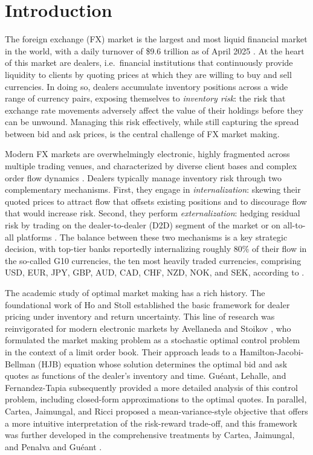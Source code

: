 \chapter{Introduction}
\label{ch:introduction}

The foreign exchange (FX) market is the largest and most liquid financial market in the world, with a daily turnover of \$9.6 trillion as of April 2025 \cite{bis2025}. At the heart of this market are dealers, i.e.\ financial institutions that continuously provide liquidity to clients by quoting prices at which they are willing to buy and sell currencies. In doing so, dealers accumulate inventory positions across a wide range of currency pairs, exposing themselves to \emph{inventory risk}: the risk that exchange rate movements adversely affect the value of their holdings before they can be unwound. Managing this risk effectively, while still capturing the spread between bid and ask prices, is the central challenge of FX market making.

Modern FX markets are overwhelmingly electronic, highly fragmented across multiple trading venues, and characterized by diverse client bases and complex order flow dynamics \cite{schrimpf2019}. Dealers typically manage inventory risk through two complementary mechanisms. First, they engage in \emph{internalization}: skewing their quoted prices to attract flow that offsets existing positions and to discourage flow that would increase risk. Second, they perform \emph{externalization}: hedging residual risk by trading on the dealer-to-dealer (D2D) segment of the market or on all-to-all platforms \cite{butz2019}. The balance between these two mechanisms is a key strategic decision, with top-tier banks reportedly internalizing roughly 80\% of their flow in the so-called G10 currencies, the ten most heavily traded currencies, comprising USD, EUR, JPY, GBP, AUD, CAD, CHF, NZD, NOK, and SEK, according to \cite{schrimpf2019}.

The academic study of optimal market making has a rich history. The foundational work of Ho and Stoll \cite{ho1981} established the basic framework for dealer pricing under inventory and return uncertainty. This line of research was reinvigorated for modern electronic markets by Avellaneda and Stoikov \cite{avellaneda2008}, who formulated the market making problem as a stochastic optimal control problem in the context of a limit order book. Their approach leads to a Hamilton-Jacobi-Bellman (HJB) equation whose solution determines the optimal bid and ask quotes as functions of the dealer's inventory and time. Gu\'{e}ant, Lehalle, and Fernandez-Tapia \cite{gueant2013} subsequently provided a more detailed analysis of this control problem, including closed-form approximations to the optimal quotes. In parallel, Cartea, Jaimungal, and Ricci \cite{cartea2014} proposed a mean-variance-style objective that offers a more intuitive interpretation of the risk-reward trade-off, and this framework was further developed in the comprehensive treatments by Cartea, Jaimungal, and Penalva \cite{cartea2015} and Gu\'{e}ant \cite{gueant2016, gueant2017}.

